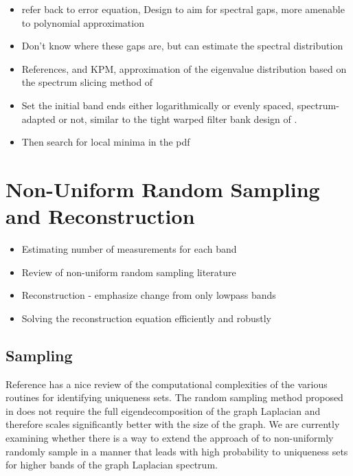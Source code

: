 \documentclass[journal, 10pt]{IEEEtran}
\begin{document}
{\begin{itemize}
\item refer back to error equation, Design to aim for spectral gaps, more amenable to polynomial approximation
\item Don't know where these gaps are, but can estimate the spectral distribution
\item References, and KPM, approximation of the eigenvalue distribution based on the spectrum slicing method of \cite[Section 3.3]{parlett}
\item Set the initial band ends either logarithmically or evenly spaced, spectrum-adapted or not, similar to the tight warped filter bank design of \cite{shuman2013spectrum}.
\item Then search for local minima in the pdf 
\end{itemize}






\section{Non-Uniform Random Sampling and Reconstruction}
\begin{itemize}
\item Estimating number of measurements for each band
\item Review of non-uniform random sampling literature
\item Reconstruction - emphasize change from only lowpass bands
\item {\color{red} Solving the reconstruction equation efficiently and robustly}
\end{itemize}

\subsection{Sampling}

Reference \cite{anis2016efficient} has a nice review of the computational complexities of the various routines for identifying uniqueness sets.  The random sampling method proposed in \cite{PuyTGV15} does not require the full eigendecomposition of the graph Laplacian and therefore scales significantly better with the size of the graph.
We are currently examining whether there is a way to extend the approach of \cite{PuyTGV15} to non-uniformly randomly sample in a manner that leads with high probability to uniqueness sets for higher bands of the graph Laplacian spectrum. 

}
\end{document}
